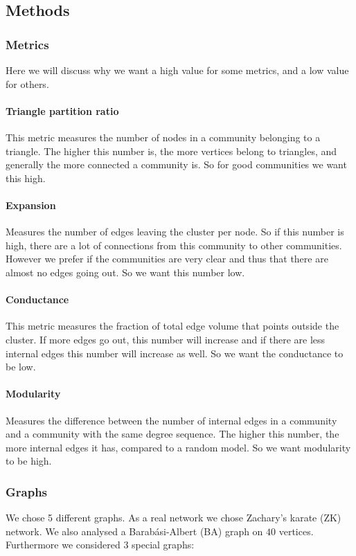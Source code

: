 \documentclass[paper=a4, fontsize=11pt]{scrartcl} %
\begin{document}
\subsection{Methods}\label{meth}
\subsubsection{Metrics}
Here we will discuss why we want a high value for some metrics, and a low value for others.
\paragraph{Triangle partition ratio} This metric measures the number of nodes in a community belonging to a triangle. The higher this number is, the more vertices belong to triangles, and generally the more connected a community is. So for good communities we want this high.
\paragraph{Expansion} Measures the number of edges leaving the cluster per node. So if this number is high, there are a lot of connections from this community to other communities. However we prefer if the communities are very clear and thus that there are almost no edges going out. So we want this number low.
\paragraph{Conductance} This metric measures the fraction of total edge volume that points outside the cluster. If more edges go out, this number will increase and if there are less internal edges this number will increase as well. So we want the conductance to be low.
\paragraph{Modularity} Measures the difference between the number of internal edges in a community and a community with the same degree sequence. The higher this number, the more internal edges it has, compared to a random model. So we want modularity to be high.

\subsubsection{Graphs}
We chose 5 different graphs. As a real network we chose Zachary's karate (ZK) network. We also analysed a Barab\'{a}si-Albert (BA) graph on $40$ vertices.
Furthermore we considered $3$ special graphs:
\end{document}
